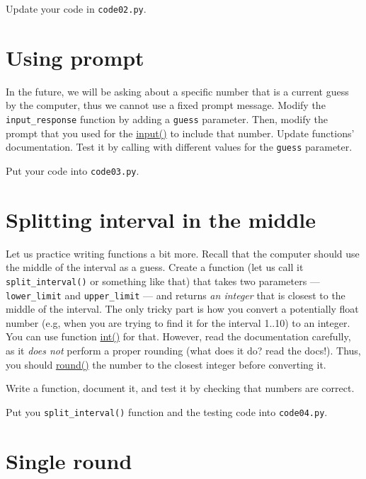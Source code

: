\documentclass[
]{book}
\begin{document}
Update your code in \texttt{code02.py}.

\hypertarget{using-prompt}{%
\section{Using prompt}\label{using-prompt}}

In the future, we will be asking about a specific number that is a current guess by the computer, thus we cannot use a fixed prompt message. Modify the \texttt{input\_response} function by adding a \texttt{guess} parameter. Then, modify the prompt that you used for the \href{https://docs.python.org/3/library/functions.html\#input}{input()} to include that number. Update functions' documentation. Test it by calling with different values for the \texttt{guess} parameter.

Put your code into \texttt{code03.py}.

\hypertarget{splitting-interval-in-the-middle}{%
\section{Splitting interval in the middle}\label{splitting-interval-in-the-middle}}

Let us practice writing functions a bit more. Recall that the computer should use the middle of the interval as a guess. Create a function (let us call it \texttt{split\_interval()} or something like that) that takes two parameters --- \texttt{lower\_limit} and \texttt{upper\_limit} --- and returns \emph{an integer} that is closest to the middle of the interval. The only tricky part is how you convert a potentially float number (e.g, when you are trying to find it for the interval 1..10) to an integer. You can use function \href{https://docs.python.org/3/library/functions.html\#int}{int()} for that. However, read the documentation carefully, as it \emph{does not} perform a proper rounding (what does it do? read the docs!). Thus, you should \href{https://docs.python.org/3/library/functions.html\#round}{round()} the number to the closest integer before converting it.

Write a function, document it, and test it by checking that numbers are correct.

Put you \texttt{split\_interval()} function and the testing code into \texttt{code04.py}.

\hypertarget{single-round}{%
\section{Single round}\label{single-round}}
\end{document}
